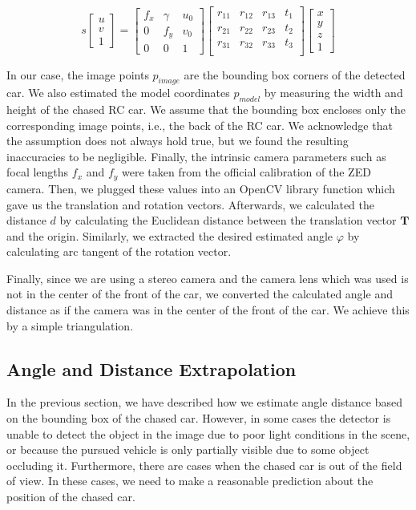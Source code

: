 \documentclass{ctuthesis/ctuthesis}
\begin{document}
\begin{equation}
s\begin{bmatrix}u\\v\\1\end{bmatrix} = \begin{bmatrix}
f_x & \gamma & u_0\\
0 & f_y & v_0\\
0 & 0 & 1
\end{bmatrix}\begin{bmatrix}
r_{11} & r_{12} & r_{13} & t_{1}\\
r_{21} & r_{22} & r_{23} & t_{2}\\
r_{31} & r_{32} & r_{33} & t_{3}\\
\end{bmatrix}
\begin{bmatrix}x\\y\\z\\1\end{bmatrix}
\end{equation}

In our case, the image points $p_{image}$ are the bounding box corners of the detected car. We also estimated the model coordinates $p_{model}$ by measuring the width and height of the chased RC car. We assume that the bounding box encloses only the corresponding image points, i.e., the back of the RC car. We acknowledge that the assumption does not always hold true, but we found the resulting inaccuracies to be negligible. Finally, the intrinsic camera parameters such as focal lengths $f_x$ and $f_y$ were taken from the official calibration of the ZED camera. Then, we plugged these values into an OpenCV \cite{opencv_library} library function which gave us the translation and rotation vectors. Afterwards, we calculated the distance $d$ by calculating the Euclidean distance between the translation vector $\mathbf{T}$ and the origin. Similarly, we extracted the desired estimated angle $\varphi$ by calculating arc tangent of the rotation vector. 

Finally, since we are using a stereo camera and the camera lens which was used is not in the center of the front of the car, we converted the calculated angle and distance as if the camera was in the center of the front of the car. We achieve this by a simple triangulation.

\subsection{Angle and Distance Extrapolation}
In the previous section, we have described how we estimate angle distance based on the bounding box of the chased car. However, in some cases the detector is unable to detect the object in the image due to poor light conditions in the scene, or because the pursued vehicle is only partially visible due to some object occluding it. Furthermore, there are cases when the chased car is out of the field of view. In these cases, we need to make a reasonable prediction about the position of the chased car. \par
\end{document}

